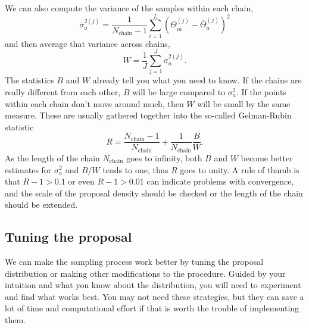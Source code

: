 We can also compute the variance of the samples within each chain,
\begin{equation} \overline\sigma^{2(j)}_a = \frac{1}{N_\textrm{chain}-1} \sum_{i=1}^L \left( \Theta_{ia}^{(j)}-\overline{\Theta}^{(j)}_{a} \right)^2\end{equation}
and then average that variance across chains,
\begin{equation}
  W=\frac{1}{J} \sum_{j=1}^J \overline\sigma^{2(j)}_a.
\end{equation}
The statistics $B$ and $W$ already tell you what you need to know.  If the chains are really different from each other, $B$ will be large compared to $\sigma^2_a$.  If the points within each chain don't move around much, then $W$ will be small by the same measure.  These are usually gathered together into the so-called Gelman-Rubin statistic
\begin{equation}
  R= {\frac{N_\textrm{chain}-1}{N_\textrm{chain}}+\frac{1}{N_\textrm{chain}}\frac{B}{W}}.
\end{equation}
As the length of the chain $N_\textrm{chain}$ goes to infinity, both $B$ and $W$ become better estimates for $\sigma^2_a$ and $B/W$ tends to one, thus $R$ goes to unity.  A rule of thumb is that $R-1 > 0.1$ or even $R-1 > 0.01$ can indicate problems with convergence, and the scale of the proposal density should be checked or the length of the chain should be extended.

\subsection{Tuning the proposal}
We can make the sampling process work better by tuning the proposal distribution or making other modifications to the procedure.  Guided by your intuition and what you know about the distribution, you will need to experiment and find what works best.  You may not need these strategies, but they can save a lot of time and computational effort if that is worth the trouble of implementing them.

